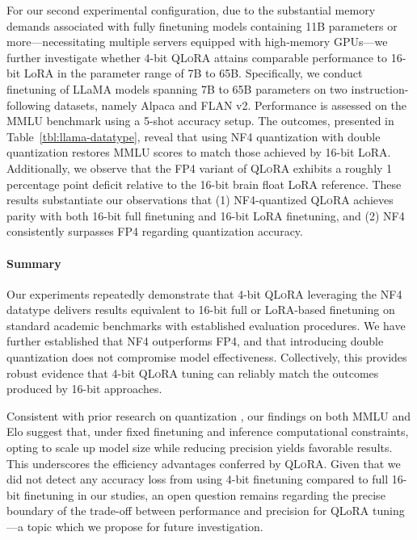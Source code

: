 For our second experimental configuration, due to the substantial memory demands associated with fully finetuning models containing 11B parameters or more—necessitating multiple servers equipped with high-memory GPUs—we further investigate whether 4-bit \textsc{QLoRA} attains comparable performance to 16-bit LoRA in the parameter range of 7B to 65B. Specifically, we conduct finetuning of LLaMA models spanning 7B to 65B parameters on two instruction-following datasets, namely Alpaca and FLAN v2. Performance is assessed on the MMLU benchmark using a 5-shot accuracy setup. The outcomes, presented in Table~\ref{tbl:llama-datatype}, reveal that using NF4 quantization with double quantization restores MMLU scores to match those achieved by 16-bit LoRA. Additionally, we observe that the FP4 variant of \textsc{QLoRA} exhibits a roughly 1 percentage point deficit relative to the 16-bit brain float LoRA reference. These results substantiate our observations that (1) NF4-quantized \textsc{QLoRA} achieves parity with both 16-bit full finetuning and 16-bit LoRA finetuning, and (2) NF4 consistently surpasses FP4 regarding quantization accuracy.

\paragraph{Summary} Our experiments repeatedly demonstrate that 4-bit \textsc{QLoRA} leveraging the NF4 datatype delivers results equivalent to 16-bit full or LoRA-based finetuning on standard academic benchmarks with established evaluation procedures. We have further established that NF4 outperforms FP4, and that introducing double quantization does not compromise model effectiveness. Collectively, this provides robust evidence that 4-bit \textsc{QLoRA} tuning can reliably match the outcomes produced by 16-bit approaches.

Consistent with prior research on quantization \citep{dettmers2022case}, our findings on both MMLU and Elo suggest that, under fixed finetuning and inference computational constraints, opting to scale up model size while reducing precision yields favorable results. This underscores the efficiency advantages conferred by \textsc{QLoRA}. Given that we did not detect any accuracy loss from using 4-bit finetuning compared to full 16-bit finetuning in our studies, an open question remains regarding the precise boundary of the trade-off between performance and precision for QLoRA tuning—a topic which we propose for future investigation.

